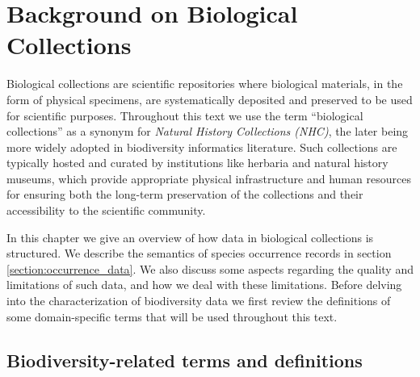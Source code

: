 \chapter{Background on Biological Collections}\label{biodiversity_data}



Biological collections are scientific repositories where biological materials, in the form of physical specimens, are systematically deposited and preserved to be used for scientific purposes. 
Throughout this text we use the term ``biological collections'' as a synonym for \textit{Natural History Collections (NHC)}, the later being more widely adopted in biodiversity informatics literature.
Such collections are typically hosted and curated by institutions like herbaria and natural history museums, which provide appropriate physical infrastructure and human resources for ensuring both the long-term preservation of the collections and their accessibility to the scientific community.

In this chapter we give an overview of how data in biological collections is structured.
We describe the semantics of species occurrence records in section \ref{section:occurrence_data}.
We also discuss some aspects regarding the quality and limitations of such data, and how we deal with these limitations.
Before delving into the characterization of biodiversity data we first review the definitions of some domain-specific terms that will be used throughout this text. 

\section{Biodiversity-related terms and definitions} \label{section:biodiversity_terms}

